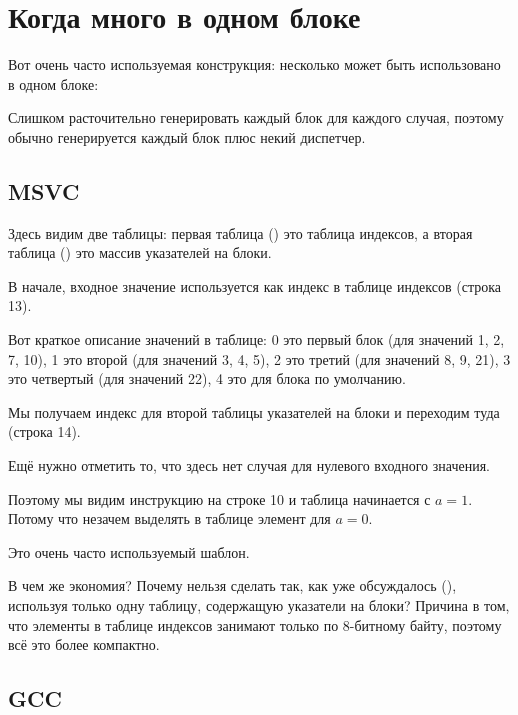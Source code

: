 \section{Когда много  в одном блоке}

Вот очень часто используемая конструкция: несколько  может быть использовано в одном блоке:



Слишком расточительно генерировать каждый блок для каждого случая, поэтому обычно
генерируется каждый блок плюс некий диспетчер.

\subsection{MSVC}



Здесь видим две таблицы: первая таблица () это таблица индексов,
а вторая таблица () это массив указателей на блоки.

В начале, входное значение используется как индекс в таблице индексов (строка 13). 

Вот краткое описание значений в таблице: 
0 это первый блок  (для значений 1, 2, 7, 10),
1 это второй (для значений 3, 4, 5),
2 это третий (для значений 8, 9, 21),
3 это четвертый (для значений 22),
4 это для блока по умолчанию.

Мы получаем индекс для второй таблицы указателей на блоки и переходим туда (строка 14).

Ещё нужно отметить то, что здесь нет случая для нулевого входного значения.

Поэтому мы видим инструкцию \DEC на строке 10 и таблица начинается с $a=1$.
Потому что незачем выделять в таблице элемент для $a=0$.

Это очень часто используемый шаблон.

В чем же экономия?
Почему нельзя сделать так, как уже обсуждалось (), используя только одну таблицу, содержащую указатели на блоки?
Причина в том, что элементы в таблице индексов занимают только по 8-битному байту, поэтому всё это более компактно.

\subsection{GCC}

